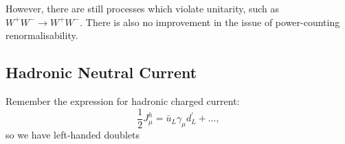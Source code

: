 \documentclass[a4paper,12pt]{article}
\begin{document}
However, there are still processes which violate unitarity, such as $W^+W^- \to W^+W^-$. There is also no improvement in the issue of power-counting renormalisability. 
%
\subsection{Hadronic Neutral Current}
%
Remember the expression for hadronic charged current:
\begin{equation}
\frac{1}{2}J_\mu^h = \bar{u}_L \gamma_\mu d^\prime_L + ...,
\end{equation}
so we have left-handed doublets
\end{document}
